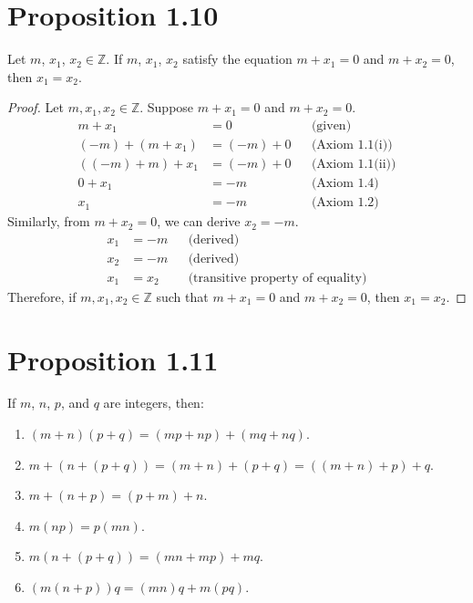 \section*{Proposition 1.10}
Let $m$, $x_1$, $x_2 \in \mathbb{Z}$. If $m$, $x_1$, $x_2$ satisfy the equation $m+x_1 = 0$ and $m+x_2 = 0$, then $x_1 = x_2$.
\begin{proof}
    Let $m, x_1, x_2 \in \mathbb{Z}$. Suppose $m + x_1 = 0$ and $m + x_2 = 0$.
    \begin{align*}
        m + x_1          & = 0        &  & \text{(given)}         \\
        (-m) + (m + x_1) & = (-m) + 0 &  & \text{(Axiom 1.1(i))}  \\
        ((-m) + m) + x_1 & = (-m) + 0 &  & \text{(Axiom 1.1(ii))} \\
        0 + x_1          & = -m       &  & \text{(Axiom 1.4)}     \\
        x_1              & = -m       &  & \text{(Axiom 1.2)}
    \end{align*}
    Similarly, from $m + x_2 = 0$, we can derive $x_2 = -m$.
    \begin{align*}
        x_1 & = -m  &  & \text{(derived)}                         \\
        x_2 & = -m  &  & \text{(derived)}                         \\
        x_1 & = x_2 &  & \text{(transitive property of equality)}
    \end{align*}
    Therefore, if $m, x_1, x_2 \in \mathbb{Z}$ such that $m + x_1 = 0$ and $m + x_2 = 0$, then $x_1 = x_2$.
\end{proof}

\section*{Proposition 1.11}
If $m$, $n$, $p$, and $q$ are integers, then:
\begin{enumerate}[label=(\roman*)]
    \item $(m+n)(p+q) = (mp+np)+(mq+nq)$.
    \item $m+(n+(p+q)) = (m+n)+(p+q) = ((m+n)+ p)+q$.
    \item $m+(n+ p) = (p+m)+n$.
    \item $m(np) = p(mn)$.
    \item $m(n+(p+q)) = (mn+mp)+mq$.
    \item $(m(n+ p))q = (mn)q+m(pq)$.
\end{enumerate}

